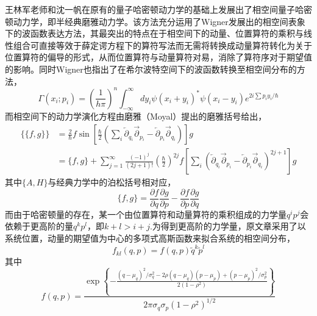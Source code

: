 王林军老师和沈一帆在原有的量子哈密顿动力学的基础上发展出了相空间量子哈密顿动力学，即半经典磨雅动力学\cite{YifanShenPSQHD,LinjunSemiclassical}。该方法充分运用了Wigner发展出的相空间表象下的波函数表达方法，其最突出的特点在于相空间下的动量、位置算符的乘积与线性组合可直接等效于薛定谔方程下的算符写法而无需将转换成动量算符转化为关于位置算符的偏导的形式\cite{wigner1997quantum}，从而位置算符与动量算符对易，消除了算符序对于期望值的影响。同时Wigner也指出了在希尔波特空间下的波函数转换至相空间分布的方法，
\begin{equation}
	\Gamma\left(x_{i} ; p_{i}\right)=\left(\frac{1}{h \pi}\right)^{n} \int_{-\infty}^{\infty} d y_{i} \psi\left(x_{i}+y_{i}\right)^{*} \psi\left(x_{i}-y_{i}\right) e^{2 i \sum p_{i} y_{i} / \hbar}
\end{equation}
而相空间下的动力学演化方程由磨雅（Moyal）提出的磨雅括号给出\cite{moyal1949quantum}，
\begin{equation}
\begin{aligned}
	 \{\{f, g\}\}&=\frac{2}{\hbar} f \sin \left[\frac{\hbar}{2}\left(\sum_{i} \overleftarrow{\partial}_{q_{i}} \overrightarrow{\partial}_{p_{i}}-\overleftarrow{\partial}_{p_{i}} \overrightarrow{\partial}_{q_{i}}\right)\right] g  \\
	 &=\{f, g\}+\sum_{j=1}^{\infty} \frac{(-1)^{j}}{(2 j+1) !}\left(\frac{\hbar}{2}\right)^{2 j} f\left[\sum_i\left(\overleftarrow{\partial}_{q_{i}} \overrightarrow{\partial}_{p_{i}}-\overleftarrow{\partial}_{p_{i}} \overrightarrow{\partial}_{q_{i}}\right)^{2 j+1}\right] g
\end{aligned}
\label{Moyal_review}
\end{equation}
其中$\{A, H\}$与经典力学中的泊松括号相对应，
\begin{equation}
	\{f, g\}=\frac{\partial f}{\partial q} \frac{\partial g}{\partial p}-\frac{\partial f}{\partial p} \frac{\partial g}{\partial q}
\end{equation}
而由于哈密顿量的存在，某一个由位置算符和动量算符的乘积组成的力学量$q^i p^j$会依赖于更高阶的量$q^k p^l$，即$k+l > i+j$.为得到更高阶的力学量，原文章采用了以系统位置，动量的期望值为中心的多项式高斯函数来拟合系统的相空间分布，
\begin{equation}
f_{k l}(q, p)=f(q, p) \tilde{q}^{k} \tilde{p}^{l}
\end{equation}
其中
\begin{equation}
	f(q, p)=\frac{\exp \left\{-\frac{\left(q-\mu_{q}\right)^{2} / \sigma_{q}^{2}-2 \rho\left(q-\mu_{q}\right)\left(p-\mu_{p}\right)+\left(p-\mu_{p}\right)^{2} / \sigma_{p}^{2}}{2\left(1-\rho^{2}\right)}\right\}}{2 \pi \sigma_{q} \sigma_{p}\left(1-\rho^{2}\right)^{1 / 2}}
\end{equation}

